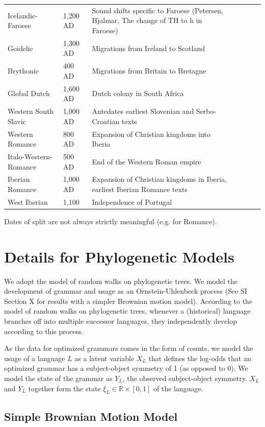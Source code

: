 \documentclass[11pt,a4paper]{article}
\begin{document}
\begin{tabular}{lllllll}
Icelandic-Faroese & 1,200 AD & Sound shifts specific to Faroese (Petersen, Hjalmar, The change of TH to h in Faroese) \\
Goidelic & 1,300 AD & Migrations from Ireland to Scotland \\
Brythonic & 400 AD & Migrations from Britain to Bretagne \\
Global Dutch & 1,600 AD & Dutch colony in South Africa \\
Western South Slavic & 1,000 AD & Antedates earliest Slovenian and Serbo-Croatian texts\\
Western Romance & 800 AD & Expansion of Christian kingdoms into Iberia \\
Italo-Western-Romance & 500 AD & End of the Western Roman empire \\
Iberian Romance & 1,000 AD & Expansion of Christian kingdoms in Iberia, earliest Iberian Romance texts \\
West Iberian & 1,100 & Independence of Portugal \\
\end{tabular}

Dates of split are not always strictly meaningful (e.g. for Romance).

\section{Details for Phylogenetic Models}



We adopt the model of random walks on phylogenetic trees.
We model the development of grammar and usage as an Ornstein-Uhlenbeck process (See SI Section X for results with a simpler Brownian motion model).
According to the model of random walks on phylogenetic trees, whenever a (historical) language branches off into multiple successor languages, they independently develop according to this process.


As the data for optimized grammars comes in the form of counts, we model the usage of a language $L$ as a latent variable $X_L$ that defines the log-odds that an optimized grammar has a subject-object symmetry of 1 (as opposed to 0).
We model the state of the grammar as $Y_L$, the observed subject-object symmetry.
$X_L$ and $Y_L$ together form the state $\xi_L \in \mathbb{R} \times [0,1]$  of the language.

\subsection{Simple Brownian Motion Model}
\end{document}
